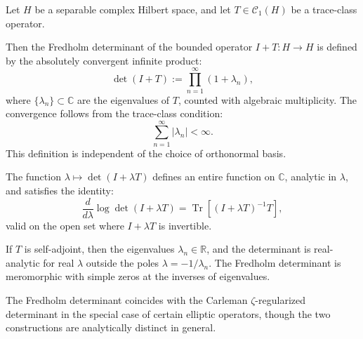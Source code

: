 \begin{definition}
\label{def:fredholm_determinant}
Let \( H \) be a separable complex Hilbert space, and let \( T \in \mathcal{C}_1(H) \) be a trace-class operator.

Then the Fredholm determinant of the bounded operator \( I + T \colon H \to H \) is defined by the absolutely convergent infinite product:
\[
\det(I + T) := \prod_{n=1}^\infty (1 + \lambda_n),
\]
where \( \{ \lambda_n \} \subset \mathbb{C} \) are the eigenvalues of \( T \), counted with algebraic multiplicity. The convergence follows from the trace-class condition:
\[
\sum_{n=1}^\infty |\lambda_n| < \infty.
\]
This definition is independent of the choice of orthonormal basis.

\medskip

The function \( \lambda \mapsto \det(I + \lambda T) \) defines an entire function on \( \mathbb{C} \), analytic in \( \lambda \), and satisfies the identity:
\[
\frac{d}{d\lambda} \log \det(I + \lambda T)
= \operatorname{Tr}\left[ (I + \lambda T)^{-1} T \right],
\]
valid on the open set where \( I + \lambda T \) is invertible.

\medskip

If \( T \) is self-adjoint, then the eigenvalues \( \lambda_n \in \mathbb{R} \), and the determinant is real-analytic for real \( \lambda \) outside the poles \( \lambda = -1/\lambda_n \). The Fredholm determinant is meromorphic with simple zeros at the inverses of eigenvalues.

\medskip

The Fredholm determinant coincides with the Carleman \(\zeta\)-regularized determinant in the special case of certain elliptic operators, though the two constructions are analytically distinct in general.
\end{definition}
% 